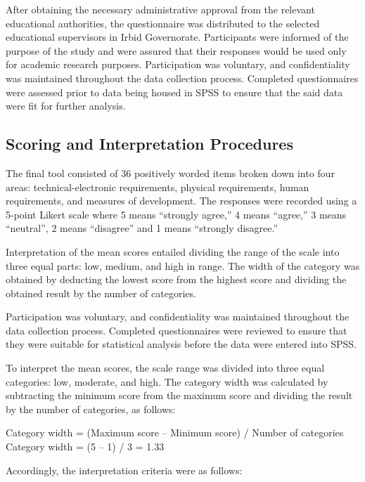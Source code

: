 \documentclass[10pt]{NSP1}
\begin{document}
After obtaining the necessary administrative approval from the relevant educational authorities, the questionnaire was distributed to the selected educational supervisors in Irbid Governorate. Participants were informed of the purpose of the study and were assured that their responses would be used only for academic research purposes. Participation was voluntary, and confidentiality was maintained throughout the data collection process. Completed questionnaires were assessed prior to data being housed in SPSS to ensure that the said data were fit for further analysis.

\subsection{Scoring and Interpretation Procedures}

The final tool consisted of 36 positively worded items broken down into four areas: technical-electronic requirements, physical requirements, human requirements, and measures of development. The responses were recorded using a 5-point Likert scale where 5 means ``strongly agree,'' 4 means ``agree,'' 3 means ``neutral'', 2 means ``disagree'' and 1 means ``strongly disagree.''

Interpretation of the mean scores entailed dividing the range of the scale into three equal parts: low, medium, and high in range. The width of the category was obtained by deducting the lowest score from the highest score and dividing the obtained result by the number of categories.

Participation was voluntary, and confidentiality was maintained throughout the data collection process. Completed questionnaires were reviewed to ensure that they were suitable for statistical analysis before the data were entered into SPSS.

To interpret the mean scores, the scale range was divided into three equal categories: low, moderate, and high. The category width was calculated by subtracting the minimum score from the maximum score and dividing the result by the number of categories, as follows:

Category width = (Maximum score -- Minimum score) / Number of categories\\
Category width = (5 -- 1) / 3 = 1.33

Accordingly, the interpretation criteria were as follows:
\end{document}
